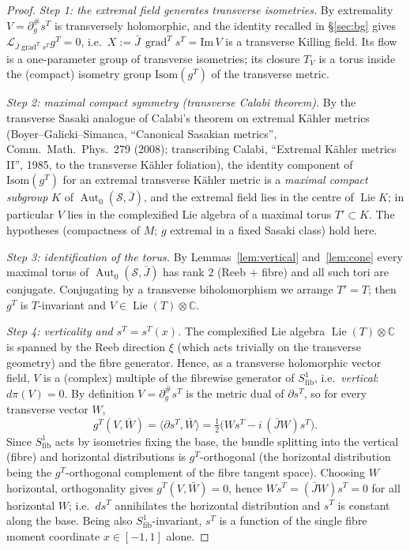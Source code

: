 \documentclass{amsart}
\theoremstyle{definition}
\DeclareMathOperator{\Aut}{Aut}
\DeclareMathOperator{\Lie}{Lie}
\DeclareMathOperator{\grad}{grad}
\begin{document}
\begin{proof}
\emph{Step 1: the extremal field generates transverse isometries.} By
extremality $V=\partial^\#_g s^T$ is transversely holomorphic, and the
identity recalled in \S\ref{sec:bg} gives $\mathcal L_{\bar
J\grad^T s^T}g^T=0$, i.e.\ $X:=\bar J\,\grad^T s^T=\mathrm{Im}\,V$ is a
transverse Killing field. Its flow is a one-parameter group of transverse
isometries; its closure $T_V$ is a torus inside the (compact) isometry group
$\mathrm{Isom}(g^T)$ of the transverse metric.

\emph{Step 2: maximal compact symmetry (transverse Calabi theorem).} By the
transverse Sasaki analogue of Calabi's theorem on extremal K\"ahler metrics
(Boyer--Galicki--Simanca, ``Canonical Sasakian metrics'', Comm.\ Math.\ Phys.\
279 (2008); transcribing Calabi, ``Extremal K\"ahler metrics II'', 1985, to the
transverse K\"ahler foliation), the identity component of $\mathrm{Isom}(g^T)$
for an extremal transverse K\"ahler metric is a \emph{maximal compact subgroup}
$K$ of $\Aut_0(\mathcal S,\bar J)$, and the extremal field lies in the centre of
$\Lie K$; in particular $V$ lies in the complexified Lie algebra of a maximal
torus $T'\subset K$. The hypotheses (compactness of $M$; $g$ extremal in a fixed
Sasaki class) hold here.

\emph{Step 3: identification of the torus.} By Lemmas~\ref{lem:vertical}
and~\ref{lem:cone} every maximal torus of $\Aut_0(\mathcal S,\bar J)$ has rank
$2$ (Reeb $+$ fibre) and all such tori are conjugate. Conjugating by a
transverse biholomorphism we arrange $T'=T$; then $g^T$ is $T$-invariant and
$V\in\Lie(T)\otimes\mathbb C$.

\emph{Step 4: verticality and $s^T=s^T(x)$.} The complexified Lie algebra
$\Lie(T)\otimes\mathbb C$ is spanned by the Reeb direction $\xi$ (which acts
trivially on the transverse geometry) and the fibre generator. Hence, as a
transverse holomorphic vector field, $V$ is a (complex) multiple of the
fibrewise generator of $S^1_{\mathrm{fib}}$, i.e.\ \emph{vertical}: $d\pi(V)=0$.
By definition $V=\partial^\#_g s^T$ is the metric dual of $\partial s^T$, so for
every transverse vector $W$,
\[
  g^T(V,\bar W)=\langle \partial s^T, \bar W\rangle = \tfrac12\bigl(W s^T - i\,(\bar J W)s^T\bigr).
\]
Since $S^1_{\mathrm{fib}}$ acts by isometries fixing the base, the bundle
splitting into the vertical (fibre) and horizontal distributions is
$g^T$-orthogonal (the horizontal distribution being the $g^T$-orthogonal
complement of the fibre tangent space). Choosing $W$ horizontal, orthogonality
gives $g^T(V,\bar W)=0$, hence $W s^T=(\bar J W)s^T=0$ for all horizontal $W$;
i.e.\ $ds^T$ annihilates the horizontal distribution and $s^T$ is constant along
the base. Being also $S^1_{\mathrm{fib}}$-invariant, $s^T$ is a function of the
single fibre moment coordinate $x\in[-1,1]$ alone.
\end{proof}
\end{document}
